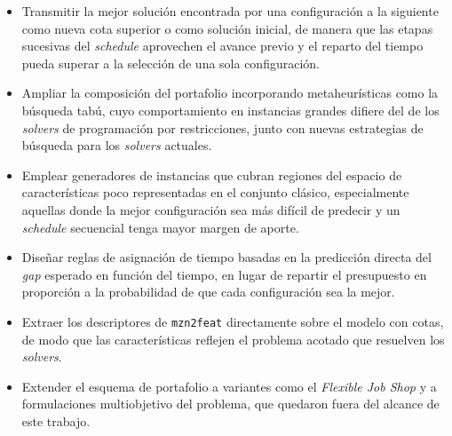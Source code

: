 \begin{itemize}
  \item Transmitir la mejor solución encontrada por una configuración a la
    siguiente como nueva cota superior o como solución inicial, de manera que
    las etapas sucesivas del \textit{schedule} aprovechen el avance previo y el
    reparto del tiempo pueda superar a la selección de una sola configuración.
  \item Ampliar la composición del portafolio incorporando metaheurísticas como
    la búsqueda tabú, cuyo comportamiento en instancias grandes difiere del de
    los \textit{solvers} de programación por restricciones, junto con nuevas
    estrategias de búsqueda para los \textit{solvers} actuales.
  \item Emplear generadores de instancias que cubran regiones del espacio de
    características poco representadas en el conjunto clásico, especialmente
    aquellas donde la mejor configuración sea más difícil de predecir y un
    \textit{schedule} secuencial tenga mayor margen de aporte.
  \item Diseñar reglas de asignación de tiempo basadas en la predicción directa
    del \textit{gap} esperado en función del tiempo, en lugar de repartir el
    presupuesto en proporción a la probabilidad de que cada configuración sea la
    mejor.
  \item Extraer los descriptores de \texttt{mzn2feat} directamente sobre el
    modelo con cotas, de modo que las características reflejen el problema
    acotado que resuelven los \textit{solvers}.
  \item Extender el esquema de portafolio a variantes como el \textit{Flexible
    Job Shop} y a formulaciones multiobjetivo del problema, que quedaron fuera
    del alcance de este trabajo.
\end{itemize}
